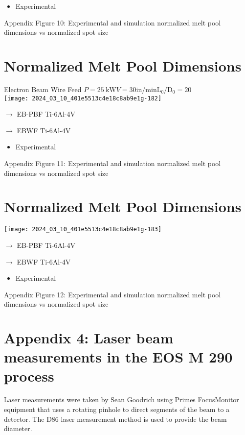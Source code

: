 \documentclass[10pt]{article}
\begin{document}
\begin{itemize}
  \item Experimental
\end{itemize}

Appendix Figure 10: Experimental and simulation normalized melt pool dimensions vs normalized spot size

\section*{Normalized Melt Pool Dimensions}
Electron Beam Wire Feed $P=25 \mathrm{~kW} V=30 \mathrm{in} / \mathrm{min} \mathrm{L}_{0} / \mathrm{D}_{0}=20$\\
\texttt{[image: 2024\_03\_10\_401e5513c4e18c8ab9e1g-182]}

$\rightarrow$ EB-PBF Ti-6Al-4V

$\longrightarrow$ EBWF Ti-6Al-4V

\begin{itemize}
  \item Experimental
\end{itemize}

Appendix Figure 11: Experimental and simulation normalized melt pool dimensions vs normalized spot size

\section*{Normalized Melt Pool Dimensions }
\begin{center}
\texttt{[image: 2024\_03\_10\_401e5513c4e18c8ab9e1g-183]}
\end{center}

$\rightarrow$ EB-PBF Ti-6Al-4V

$\rightarrow$ EBWF Ti-6Al-4V

\begin{itemize}
  \item Experimental
\end{itemize}

Appendix Figure 12: Experimental and simulation normalized melt pool dimensions vs normalized spot size

\section*{Appendix 4: Laser beam measurements in the EOS M 290 process}
Laser measurements were taken by Sean Goodrich using Primes FocusMonitor equipment that uses a rotating pinhole to direct segments of the beam to a detector. The D86 laser measurement method is used to provide the beam diameter.
\end{document}
